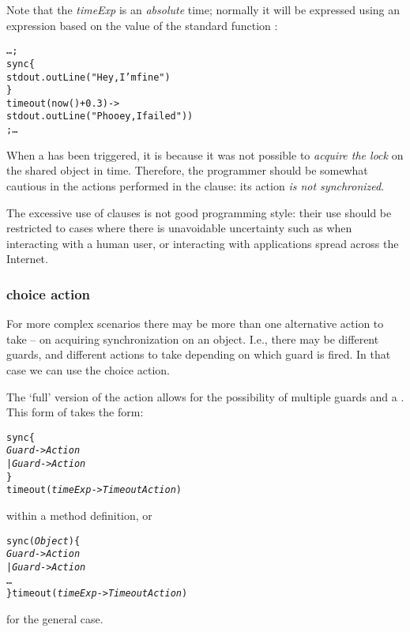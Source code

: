 Note that the \emph{timeExp} is an \emph{absolute} time; normally it will be expressed using an expression based on the value of the standard function :
\begin{alltt}
\ldots;
  sync\{
    stdout.outLine("Hey, I'm fine")
  \}
  timeout (now()+0.3) -> 
    stdout.outLine("Phooey, I failed"))
  ;\ldots
\end{alltt}
\begin{aside}
When a  has been triggered, it is because it was not possible to \emph{acquire the lock} on the shared object in time. Therefore, the programmer should be somewhat cautious in the actions performed in the  clause: its action \emph{is not synchronized}.

The excessive use of  clauses is not good programming style: their use should be restricted to cases where there is unavoidable uncertainty such as when interacting with a human user, or interacting with applications spread across the Internet.
\end{aside}

\subsubsection{ choice action}
\label{action:sync:choice}
For more complex scenarios there may be more than one alternative action to take -- on acquiring synchronization on an object. I.e., there may be different guards, and different actions to take depending on which guard is fired. In that case we can use the  choice action.

The `full' version of the  action allows for the possibility of multiple guards and a . This form of  takes the form:
\begin{alltt}
sync\{
  \emph{Guard} -> \emph{Action}
| \emph{Guard} -> \emph{Action}
\}
timeout (\emph{timeExp} -> \emph{TimeoutAction})
\end{alltt}
within a method definition, or
\begin{alltt}
sync(\emph{Object})\{
  \emph{Guard} -> \emph{Action}
| \emph{Guard} -> \emph{Action}
\ldots
\} timeout (\emph{timeExp} -> \emph{TimeoutAction})
\end{alltt}
for the general case.

